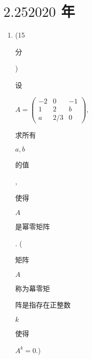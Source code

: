 \documentclass[10pt]{article}
\begin{document}
\section{$2.252020$ 年}
\begin{enumerate}
  \item (15 \begin{CJK}{UTF8}{mj}分\end{CJK}) \begin{CJK}{UTF8}{mj}设\end{CJK} $A=\left(\begin{array}{ccc}-2 & 0 & -1 \\ 1 & 2 & b \\ a & 2 / 3 & 0\end{array}\right)$, \begin{CJK}{UTF8}{mj}求所有\end{CJK} $a, b$ \begin{CJK}{UTF8}{mj}的值\end{CJK}, \begin{CJK}{UTF8}{mj}使得\end{CJK} $A$ \begin{CJK}{UTF8}{mj}是幂零矩阵\end{CJK}. (\begin{CJK}{UTF8}{mj}矩阵\end{CJK} $A$ \begin{CJK}{UTF8}{mj}称为幕零矩\end{CJK} \begin{CJK}{UTF8}{mj}阵是指存在正整数\end{CJK} $k$ \begin{CJK}{UTF8}{mj}使得\end{CJK} $A^{k}=0$.)


\end{enumerate}
\end{document}
